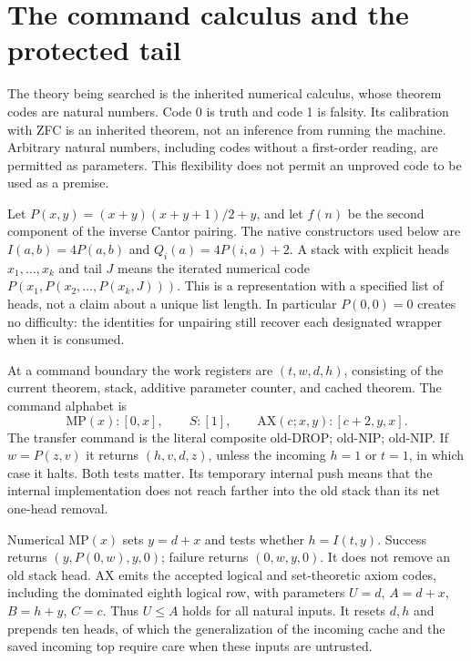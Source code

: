 \section{The command calculus and the protected tail}
The theory being searched is the inherited numerical calculus, whose theorem codes are natural numbers. Code 0 is truth and code 1 is falsity. Its calibration with ZFC is an inherited theorem, not an inference from running the machine. Arbitrary natural numbers, including codes without a first-order reading, are permitted as parameters. This flexibility does not permit an unproved code to be used as a premise.

Let $P(x,y)=(x+y)(x+y+1)/2+y$, and let $f(n)$ be the second component of the inverse Cantor pairing. The native constructors used below are $I(a,b)=4P(a,b)$ and $Q_i(a)=4P(i,a)+2$. A stack with explicit heads $x_1,\ldots,x_k$ and tail $J$ means the iterated numerical code $P(x_1,P(x_2,\ldots,P(x_k,J)))$. This is a representation with a specified list of heads, not a claim about a unique list length. In particular $P(0,0)=0$ creates no difficulty: the identities for unpairing still recover each designated wrapper when it is consumed.

At a command boundary the work registers are $(t,w,d,h)$, consisting of the current theorem, stack, additive parameter counter, and cached theorem. The command alphabet is
\[
\mathrm{MP}(x):[0,x],\qquad S:[1],\qquad
\mathrm{AX}(c;x,y):[c+2,y,x].
\]
The transfer command is the literal composite old-DROP; old-NIP; old-NIP. If $w=P(z,v)$ it returns $(h,v,d,z)$, unless the incoming $h=1$ or $t=1$, in which case it halts. Both tests matter. Its temporary internal push means that the internal implementation does not reach farther into the old stack than its net one-head removal.

Numerical $\mathrm{MP}(x)$ sets $y=d+x$ and tests whether $h=I(t,y)$. Success returns $(y,P(0,w),y,0)$; failure returns $(0,w,y,0)$. It does not remove an old stack head. AX emits the accepted logical and set-theoretic axiom codes, including the dominated eighth logical row, with parameters $U=d$, $A=d+x$, $B=h+y$, $C=c$. Thus $U\le A$ holds for all natural inputs. It resets $d,h$ and prepends ten heads, of which the generalization of the incoming cache and the saved incoming top require care when these inputs are untrusted.


